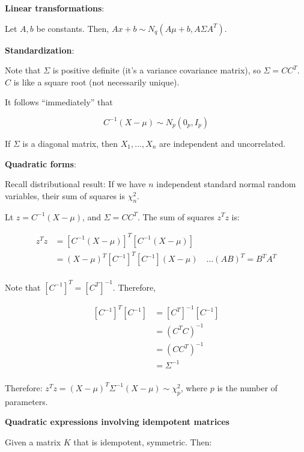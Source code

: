 \documentclass[10pt,landscape]{article}
\begin{document}
\begin{multicols}{3}
\textbf{Linear transformations}:

Let $A, b$ be constants. Then, $Ax + b\sim N_q (A\mu + b, A\Sigma A^T)$.

\textbf{Standardization}:

Note that $\Sigma$ is positive definite (it's a variance covariance matrix), so $\Sigma = CC^T$. 
$C$ is like a square root (not necessarily unique).
 
It follows ``immediately'' that 

\begin{equation}
C^{-1} (X-\mu) \sim N_p (0_p, I_p)
\end{equation}

If $\Sigma$ is a diagonal matrix, then $X_1,\dots,X_n$ are independent and uncorrelated.

\textbf{Quadratic forms}:

Recall distributional result: If we have $n$ independent standard normal random variables, their sum of squares is $\chi_n^2$.

Lt $z = C^{-1} (X-\mu)$, and $\Sigma=CC^T$. The sum of squares $z^T z$ is:

\begin{equation}
\begin{split}
z^T z & = [C^{-1} (X-\mu)]^T [C^{-1} (X-\mu)]\\
& = (X-\mu)^T [C^{-1}]^T [C^{-1}](X-\mu) \quad \dots (AB)^T=B^T A^T\\
\end{split}
\end{equation} 

Note that $ [C^{-1}]^T =  [C^{T}]^{-1}$. Therefore, 

\begin{equation}
\begin{split}
[C^{-1}]^T [C^{-1}] & = [C^T]^{-1} [C^{-1}]\\
& = (C^T C)^{-1}\\
& = (C C^T)^{-1}\\
& = \Sigma^{-1}\\
\end{split}
\end{equation} 

Therefore: $z^T z = (X-\mu)^T  \Sigma^{-1} (X-\mu)\sim \chi_p^2$, where $p$ is the number of parameters.

\textbf{Quadratic expressions involving idempotent matrices}

Given a matrix $K$ that is idempotent, symmetric. Then:


\end{multicols}
\end{document}
